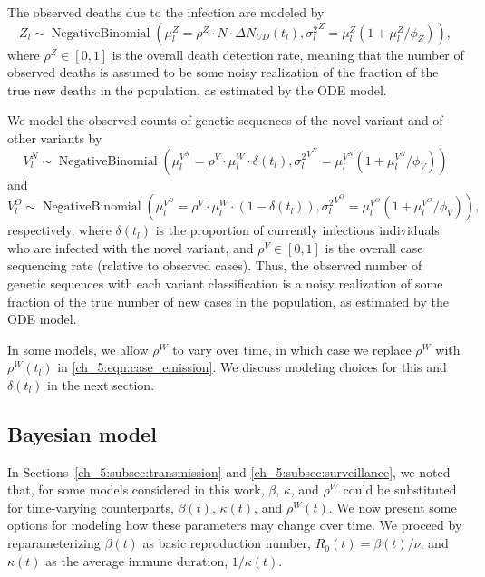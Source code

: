 The observed deaths due to the infection are modeled by
\begin{equation}
Z_l \sim \operatorname{Negative Binomial} \left( \mu^{Z}_l = \rho^Z \cdot N \cdot \Delta N_{UD} \left( t_l \right), {\sigma^2_l}^{Z} = \mu^{Z}_l \left( 1 + \mu^{Z}_l / \phi_Z \right) \right),
\label{ch_5:eqn:death_emission}
\end{equation}
where \( \rho^Z \in [0,1]\) is the overall death detection rate, meaning that the number of observed deaths is assumed to be some noisy realization of the fraction of the true new deaths in the population, as estimated by the ODE model.

We model the observed counts of genetic sequences of the novel variant and of other variants by
\begin{equation}
V^N_l \sim \operatorname{Negative Binomial} \left( \mu^{V^N}_l = \rho^V \cdot \mu^{W}_l \cdot \delta \left( t_l \right), {\sigma^2_l}^{V^N} = \mu^{V^N}_l \left( 1 + \mu^{V^N}_l / \phi_V \right) \right)
\label{ch_5:eqn:novel_variant_emission}
\end{equation}
and
\begin{equation}
V^O_l \sim \operatorname{Negative Binomial} \left( \mu^{V^O}_l = \rho^V \cdot \mu^{W}_l \cdot \left( 1 - \delta \left( t_l \right) \right), {\sigma^2_l}^{V^O} = \mu^{V^O}_l \left( 1 + \mu^{V^O}_l / \phi_V \right)  \right),
\label{ch_5:eqn:other_variant_emission}
\end{equation}
respectively, where \( \delta \left( t_l \right) \) is the proportion of currently infectious individuals who are infected with the novel variant, and \( \rho^V \in [0,1] \) is the overall case sequencing rate (relative to observed cases).
Thus, the observed number of genetic sequences with each variant classification is a noisy realization of some fraction of the true number of new cases in the population, as estimated by the ODE model.

In some models, we allow \( \rho^W \) to vary over time, in which case we replace \( \rho^W \) with \( \rho^W \left( t_l \right) \) in \eqref{ch_5:eqn:case_emission}.
We discuss modeling choices for this and \( \delta \left( t_l \right) \) in the next section.

\subsection{Bayesian model}
\label{ch_5:subsec:bayesian}

In Sections~\ref{ch_5:subsec:transmission} and \ref{ch_5:subsec:surveillance}, we noted that, for some models considered in this work, \( \beta \), \( \kappa \), and \( \rho^W \) could be substituted for time-varying counterparts, \( \beta(t) \), \( \kappa(t) \), and \( \rho^W(t) \).
We now present some options for modeling how these parameters may change over time.
We proceed by reparameterizing \( \beta(t) \) as  basic reproduction number, \( R_0(t) = \beta(t) / \nu \), and \( \kappa(t) \) as the average immune duration, \( 1 / \kappa(t) \).

